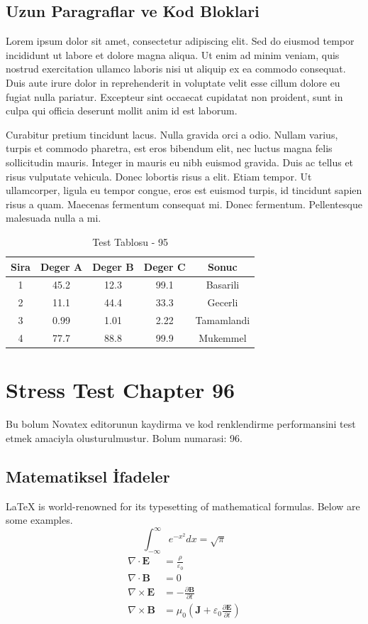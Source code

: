 \documentclass[12pt,a4paper]{article}
\begin{document}
\subsection{Uzun Paragraflar ve Kod Bloklari}
Lorem ipsum dolor sit amet, consectetur adipiscing elit. Sed do eiusmod tempor incididunt ut labore et dolore magna aliqua. Ut enim ad minim veniam, quis nostrud exercitation ullamco laboris nisi ut aliquip ex ea commodo consequat. Duis aute irure dolor in reprehenderit in voluptate velit esse cillum dolore eu fugiat nulla pariatur. Excepteur sint occaecat cupidatat non proident, sunt in culpa qui officia deserunt mollit anim id est laborum.

Curabitur pretium tincidunt lacus. Nulla gravida orci a odio. Nullam varius, turpis et commodo pharetra, est eros bibendum elit, nec luctus magna felis sollicitudin mauris. Integer in mauris eu nibh euismod gravida. Duis ac tellus et risus vulputate vehicula. Donec lobortis risus a elit. Etiam tempor. Ut ullamcorper, ligula eu tempor congue, eros est euismod turpis, id tincidunt sapien risus a quam. Maecenas fermentum consequat mi. Donec fermentum. Pellentesque malesuada nulla a mi.

\begin{table}[h!]
\centering
\begin{tabular}{|c|c|c|c|c|}
\hline
\textbf{Sira} & \textbf{Deger A} & \textbf{Deger B} & \textbf{Deger C} & \textbf{Sonuc} \\
\hline
1 & 45.2 & 12.3 & 99.1 & Basarili \\
2 & 11.1 & 44.4 & 33.3 & Gecerli \\
3 & 0.99 & 1.01 & 2.22 & Tamamlandi \\
4 & 77.7 & 88.8 & 99.9 & Mukemmel \\
\hline
\end{tabular}
\caption{Test Tablosu - 95}
\end{table}

\newpage
\section{Stress Test Chapter 96}
Bu bolum Novatex editorunun kaydirma ve kod renklendirme performansini test etmek amaciyla olusturulmustur. Bolum numarasi: 96.

\subsection{Matematiksel İfadeler}
\LaTeX{} is world-renowned for its typesetting of mathematical formulas. Below are some examples.
\begin{equation}
\int_{-\infty}^{\infty} e^{-x^2} dx = \sqrt{\pi}
\end{equation}
\begin{align}
\nabla \cdot \mathbf{E} &= \frac{\rho}{\varepsilon_0} \\
\nabla \cdot \mathbf{B} &= 0 \\
\nabla \times \mathbf{E} &= -\frac{\partial \mathbf{B}}{\partial t} \\
\nabla \times \mathbf{B} &= \mu_0\left(\mathbf{J} + \varepsilon_0 \frac{\partial \mathbf{E}}{\partial t}\right)
\end{align}
\end{document}
